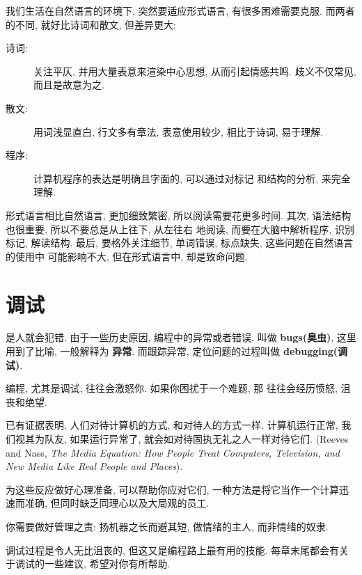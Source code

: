 \documentclass[10pt]{book}
\begin{document}
我们生活在自然语言的环境下, 突然要适应形式语言, 有很多困难需要克服. 
而两者的不同, 就好比诗词和散文, 但差异更大:  

\begin{description}

\item[诗词:] 关注平仄, 并用大量表意来渲染中心思想, 从而引起情感共鸣.
歧义不仅常见, 而且是故意为之. 

\item[散文:] 用词浅显直白, 行文多有章法, 表意使用较少, 相比于诗词, 易于理解. 

\item[程序:] 计算机程序的表达是明确且字面的, 可以通过对标记
和结构的分析, 来完全理解. 


\end{description}

形式语言相比自然语言, 更加细致繁密, 所以阅读需要花更多时间. 
其次, 语法结构也很重要, 所以不要总是从上往下, 从左往右
地阅读, 而要在大脑中解析程序, 识别标记, 解读结构. 
最后, 要格外关注细节, 单词错误, 标点缺失, 这些问题在自然语言的使用中
可能影响不大, 但在形式语言中, 却是致命问题. 

\section{调试}

是人就会犯错. 由于一些历史原因, 编程中的异常或者错误, 叫做 {\bf bugs(臭虫)}, 
这里用到了比喻, 一般解释为 {\bf 异常}. 
而跟踪异常, 定位问题的过程叫做 {\bf debugging(调试)}. 

编程, 尤其是调试, 往往会激怒你. 如果你困扰于一个难题, 那
往往会经历愤怒, 沮丧和绝望. 

已有证据表明, 人们对待计算机的方式, 和对待人的方式一样. 
计算机运行正常, 我们视其为队友, 如果运行异常了, 
就会如对待固执无礼之人一样对待它们. 
 (Reeves and Nass, {\it The Media
 Equation: How People Treat Computers, Television, and New Media
 Like Real People and Places}).

为这些反应做好心理准备, 可以帮助你应对它们, 一种方法是将它当作一个计算迅速而准确, 
但同时缺乏同理心以及大局观的员工. 

你需要做好管理之责: 扬机器之长而避其短, 做情绪的主人, 而非情绪的奴隶. 

调试过程是令人无比沮丧的, 但这又是编程路上最有用的技能. 
每章末尾都会有关于调试的一些建议, 希望对你有所帮助. 
\end{document}
